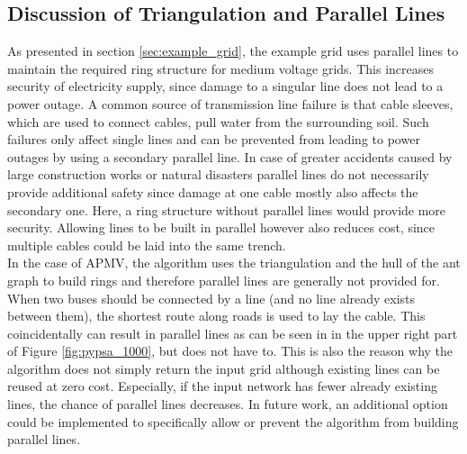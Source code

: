 \subsection{Discussion of Triangulation and Parallel Lines}\label{sec:discussion}
As presented in section \ref{sec:example_grid}, the example grid uses parallel lines to maintain the required ring structure for medium voltage grids. This increases security of electricity supply, since damage to a singular line does not lead to a power outage. A common source of transmission line failure is that cable sleeves, which are used to connect cables, pull water from the surrounding soil. Such failures only affect single lines and can be prevented from leading to power outages by using a secondary parallel line. In case of greater accidents caused by large construction works or natural disasters parallel lines do not necessarily provide additional safety since damage at one cable mostly also affects the secondary one. Here, a ring structure without parallel lines would provide more security. Allowing lines to be built in parallel however also reduces cost, since multiple cables could be laid into the same trench. \\
In the case of APMV, the algorithm uses the triangulation and the hull of the ant graph to build rings and therefore parallel lines are generally not provided for. When two buses should be connected by a line (and no line already exists between them), the shortest route along roads is used to lay the cable. This coincidentally can result in parallel lines as can be seen in in the upper right part of Figure \ref{fig:pypsa_1000}, but does not have to. This is also the reason why the algorithm does not simply return the input grid although existing lines can be reused at zero cost. Especially, if the input network has fewer already existing lines, the chance of parallel lines decreases. In future work, an additional option could be implemented to specifically allow or prevent the algorithm from building parallel lines.
	
	
	
	
	
	
	
	
	
	
	
	
	
	